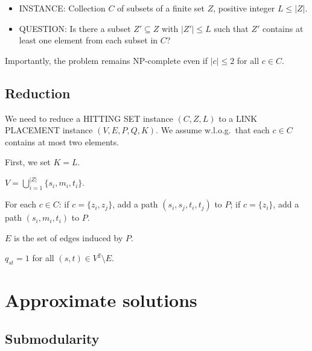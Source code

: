 \documentclass[12pt,letterpaper]{article}
\begin{document}
\begin{itemize}
\item INSTANCE: Collection $C$ of subsets of a finite set $Z$, positive integer $L \leq |Z|$.
\item QUESTION: Is there a subset $Z' \subseteq Z$ with $|Z'| \leq L$ such that $Z'$ contains at least one element from each subset in $C$?
\end{itemize}

Importantly, the problem remains NP-complete even if $|c| \leq 2$ for all $c \in C$.

\subsection{Reduction}

We need to reduce a HITTING SET instance $(C,Z,L)$ to a LINK PLACEMENT instance $(V,E,P,Q,K)$.
We assume w.l.o.g.\ that each $c \in C$ contains at most two elements.

First, we set $K=L$.

$V=\bigcup_{i=1}^{|Z|} \{s_i, m_i, t_i\}$.

For each $c \in C$: if $c=\{z_i,z_j\}$, add a path $(s_i,s_j,t_i,t_j)$ to $P$; if $c=\{z_i\}$, add a path $(s_i,m_i,t_i)$ to $P$.

$E$ is the set of edges induced by $P$.

$q_{st}=1$ for all $(s,t) \in V^2 \setminus E$.


\section{Approximate solutions}

\subsection{Submodularity}
\end{document}
